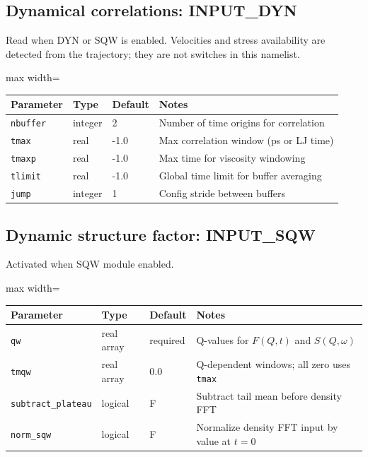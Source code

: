\documentclass[final,1p,times]{elsarticle}
\begin{document}
\subsection{Dynamical correlations: INPUT\_DYN}
Read when DYN or SQW is enabled. Velocities and stress availability are detected from the trajectory; they are not switches in this namelist.
\begin{center}
\begin{adjustbox}{max width=\textwidth}
\begin{tabular}{llll}
\hline
Parameter & Type & Default & Notes \\
\hline
\texttt{nbuffer} & integer & 2 & Number of time origins for correlation \\
\texttt{tmax} & real & -1.0 & Max correlation window (ps or LJ time) \\
\texttt{tmaxp} & real & -1.0 & Max time for viscosity windowing \\
\texttt{tlimit} & real & -1.0 & Global time limit for buffer averaging \\
\texttt{jump} & integer & 1 & Config stride between buffers \\
\hline
\end{tabular}
\end{adjustbox}
\end{center}

\subsection{Dynamic structure factor: INPUT\_SQW}
Activated when SQW module enabled.
\begin{center}
\begin{adjustbox}{max width=\textwidth}
\begin{tabular}{llll}
\hline
Parameter & Type & Default & Notes \\
\hline
\texttt{qw} & real array & required & Q-values for $F(Q,t)$ and $S(Q,\omega)$ \\
\texttt{tmqw} & real array & 0.0 & Q-dependent windows; all zero uses \texttt{tmax} \\
\texttt{subtract\_plateau} & logical & F & Subtract tail mean before density FFT \\
\texttt{norm\_sqw} & logical & F & Normalize density FFT input by value at $t=0$ \\
\hline
\end{tabular}
\end{adjustbox}
\end{center}
\end{document}
